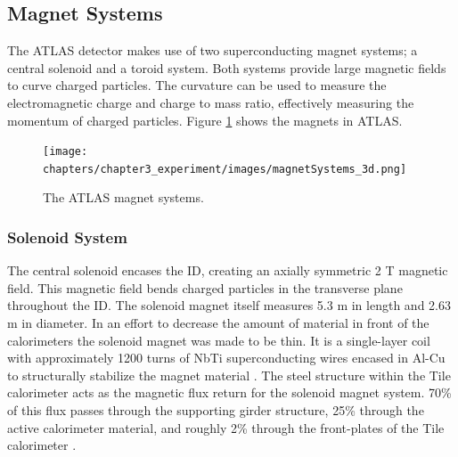 	\subsection{Magnet Systems}\label{ssec:magnets}
	The \gls{ATLAS} detector makes use of two superconducting magnet systems; a central solenoid and a toroid system. Both systems provide large magnetic fields to curve charged particles. The curvature can be used to measure the electromagnetic charge and charge to mass ratio, effectively measuring the momentum of charged particles. Figure \ref{fig:ATLAS-magnets} shows the magnets in \gls{ATLAS}.

	\begin{figure}[!ht]
	\centering
	\texttt{[image: chapters/chapter3\_experiment/images/magnetSystems\_3d.png]}
	\caption{ The ATLAS magnet systems. \cite{atlas-schematics}}
	\label{fig:ATLAS-magnets}
	\end{figure}

	\subsubsection{Solenoid System}\label{sssec:solenoid}
		The central solenoid encases the \gls{ID}, creating an axially symmetric 2 T magnetic field. This magnetic field bends charged particles in the transverse plane throughout the \gls{ID}. The solenoid magnet itself measures 5.3 m in length and 2.63 m in diameter. In an effort to decrease the amount of material in front of the calorimeters the solenoid magnet was made to be thin. It is a single-layer coil with approximately 1200 turns of NbTi superconducting wires encased in Al-Cu to structurally stabilize the magnet material \cite{atlas-solenoid}. The steel structure within the Tile calorimeter acts as the magnetic flux return for the solenoid magnet system. 70\% of this flux passes through the supporting girder structure, 25\% through the active calorimeter material, and roughly 2\% through the front-plates of the Tile calorimeter \cite{ATLAS-tile}.

